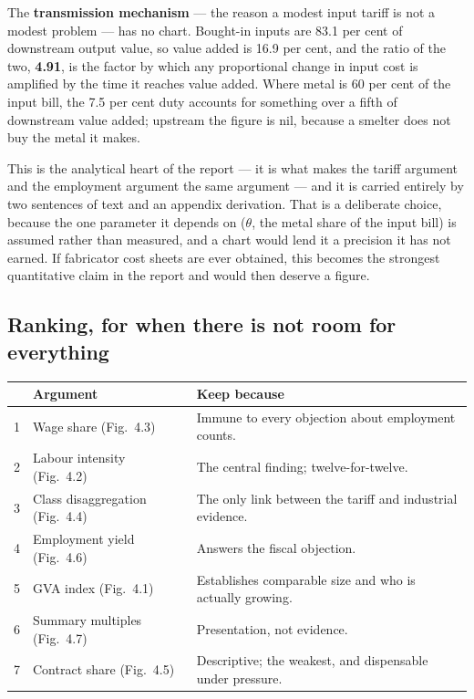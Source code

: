 \documentclass[11pt, a4paper]{article}
\begin{document}
The \textbf{transmission mechanism} --- the reason a modest input tariff is not a modest
problem --- has no chart. Bought-in inputs are 83.1 per cent of downstream output value,
so value added is 16.9 per cent, and the ratio of the two, \textbf{4.91}, is the factor
by which any proportional change in input cost is amplified by the time it reaches
value added. Where metal is 60 per cent of the input bill, the 7.5 per cent duty
accounts for something over a fifth of downstream value added; upstream the figure is
nil, because a smelter does not buy the metal it makes.

This is the analytical heart of the report --- it is what makes the tariff argument and
the employment argument the same argument --- and it is carried entirely by two
sentences of text and an appendix derivation. That is a deliberate choice, because the
one parameter it depends on ($\theta$, the metal share of the input bill) is assumed
rather than measured, and a chart would lend it a precision it has not earned. If
fabricator cost sheets are ever obtained, this becomes the strongest quantitative
claim in the report and would then deserve a figure.

\subsection{Ranking, for when there is not room for everything}

\begin{table}[H]
\centering\small
\begin{tabular}{clp{7.4cm}}
\toprule
& \textbf{Argument} & \textbf{Keep because} \\
\midrule
1 & Wage share (Fig.~4.3) & Immune to every objection about employment counts. \\
2 & Labour intensity (Fig.~4.2) & The central finding; twelve-for-twelve. \\
3 & Class disaggregation (Fig.~4.4) & The only link between the tariff and industrial evidence. \\
4 & Employment yield (Fig.~4.6) & Answers the fiscal objection. \\
5 & GVA index (Fig.~4.1) & Establishes comparable size and who is actually growing. \\
6 & Summary multiples (Fig.~4.7) & Presentation, not evidence. \\
7 & Contract share (Fig.~4.5) & Descriptive; the weakest, and dispensable under pressure. \\
\bottomrule
\end{tabular}
\end{table}
\end{document}
